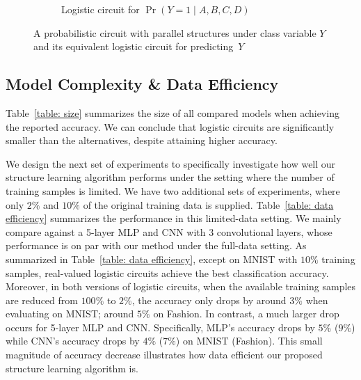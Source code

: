 \documentclass[letterpaper]{article} %
\begin{document}
\begin{figure}[t]
\begin{subfigure}[t]{0.34\textwidth}
{
}
\caption{Logistic circuit for $\Pr(Y=1 \mid A,B,C,D)$} \label{circuit: prop circuit: equivtoprob}
\end{subfigure}
\caption{A probabilistic circuit with parallel structures under class variable $Y$ and its equivalent logistic circuit for predicting~$Y$}
\label{circuit: prop circuit}
\end{figure}

\subsection{Model Complexity \& Data Efficiency}
Table~\ref{table: size} summarizes the size of all compared models when achieving the reported  accuracy. We can conclude that logistic circuits are significantly smaller than the alternatives, despite attaining higher accuracy.

We design the next set of experiments to specifically investigate how well our structure learning algorithm performs under the setting where the number of training samples is limited.  We have two additional sets of experiments, where only $2\%$ and $10\%$ of the original training data is supplied.
Table~\ref{table: data efficiency} summarizes the performance in this limited-data setting.
We mainly compare against a 5-layer MLP and CNN with 3 convolutional layers, whose performance is on par with our method under the full-data setting. As summarized in Table~\ref{table: data efficiency}, except on MNIST with $10\%$ training samples, real-valued logistic circuits achieve the best classification accuracy. Moreover, in both versions of logistic circuits, when the available training samples are reduced from $100\%$ to $2\%$, the accuracy only drops by around $3\%$ when evaluating on MNIST; around $5\%$ on Fashion. In contrast, a much larger drop occurs for 5-layer MLP and CNN. Specifically, MLP's accuracy drops by $5\%$ ($9\%$) while CNN's accuracy drops by $4\%$ ($7\%$) on MNIST (Fashion). This small magnitude of accuracy decrease illustrates how data efficient our proposed structure learning algorithm is.
\end{document}
